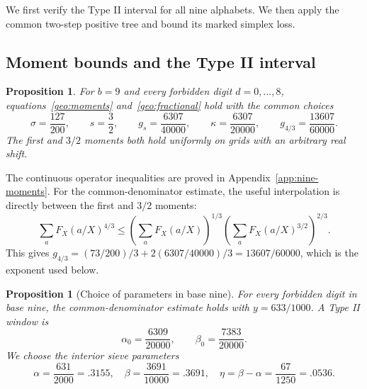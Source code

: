 \documentclass[11pt,a4paper]{article}
\theoremstyle{paperplain}
\newtheorem{proposition}[theorem]{Proposition}
\numberwithin{equation}{section}
\begin{document}
We first verify the Type II interval for all nine alphabets. We then
apply the common two-step positive tree and bound its marked simplex loss.

\subsection{Moment bounds and the Type II interval}\label{nine:fourier-section}

\begin{proposition}\label{nine:fourier}
For $b=9$ and every forbidden digit $d=0,\ldots,8$,
equations~\eqref{geo:moments} and~\eqref{geo:fractional} hold with the common choices
\begin{equation}\label{nine:moment-values}
 \sigma=\frac{127}{200},\qquad s=\frac32,\qquad
 g_s=\frac{6307}{40000},\qquad
 \kappa=\frac{6307}{20000},\qquad
 g_{4/3}=\frac{13607}{60000}.
\end{equation}
The first and $3/2$ moments both hold uniformly on grids with an arbitrary real shift.
\end{proposition}

The continuous operator inequalities are proved in
Appendix~\ref{app:nine-moments}. For the common-denominator estimate, the
useful interpolation is directly between the first and $3/2$ moments:
\[
 \sum_a F_X(a/X)^{4/3}
 \le\left(\sum_a F_X(a/X)\right)^{1/3}
      \left(\sum_a F_X(a/X)^{3/2}\right)^{2/3}.
\]
This gives $g_{4/3}=(73/200)/3+2(6307/40000)/3=13607/60000$,
which is the exponent used below.

\begin{proposition}[Choice of parameters in base nine]\label{nine:parameters}
For every forbidden digit in base nine, the common-denominator estimate holds
with $y=633/1000$. A Type II window is
\begin{equation}\label{nine:buffer}
 \alpha_0=\frac{6309}{20000},\qquad
 \beta_0=\frac{7383}{20000}.
\end{equation}
We choose the interior sieve parameters
\begin{equation}\label{nine:sieve-params}
 \alpha=\frac{631}{2000}=.3155,\quad
 \beta=\frac{3691}{10000}=.3691,\quad
 \eta=\beta-\alpha=\frac{67}{1250}=.0536.
\end{equation}
\end{proposition}
\end{document}

